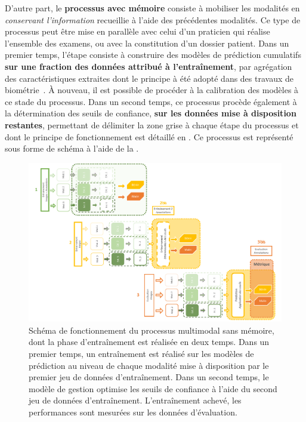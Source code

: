 D'autre part, le \textbf{processus avec mémoire} consiste à mobiliser les modalités en \textit{conservant l'information} recueillie à l'aide des précédentes modalités. Ce type de processus peut être mise en parallèle avec celui d'un praticien qui réalise l'ensemble des examens, ou avec la constitution d'un dossier patient. Dans un premier temps, l'étape consiste à construire des modèles de prédiction cumulatifs \textbf{sur une fraction des données attribué à l'entraînement}, par agrégation des caractéristiques extraites dont le principe à été adopté dans des travaux de biométrie~\cite{Krishneswari2012}. À nouveau, il est possible de procéder à la calibration des modèles à ce stade du processus. Dans un second temps, ce processus procède également à la détermination des seuils de confiance, \textbf{sur les données mise à disposition restantes}, permettant de délimiter la zone grise à chaque étape du processus et dont le principe de fonctionnement est détaillé en . Ce processus est représenté sous forme de schéma à l'aide de la .\par

\begin{landscape}
\begin{figure}[H]
    \centering
    \includegraphics[width=0.85\linewidth]{contents/chapter_8/resources/scheme_multimodal_process_without.pdf}
    \caption{Schéma de fonctionnement du processus multimodal sans mémoire, dont la phase d'entraînement est réalisée en deux temps. Dans un premier temps, un entraînement est réalisé sur les modèles de prédiction au niveau de chaque modalité mise à disposition par le premier jeu de données d'entraînement. Dans un second temps, le modèle de gestion optimise les seuils de confiance à l'aide du second jeu de données d'entraînement. L'entraînement achevé, les performances sont mesurées sur les données d'évaluation.}
    \label{fig:scheme_multimodal_process_without}
\end{figure}\par
\end{landscape}

